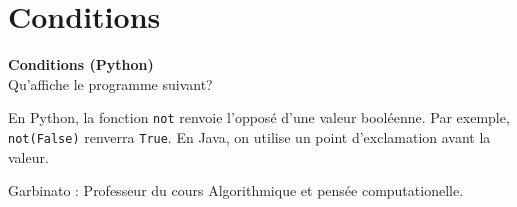 \newpage

\section{Conditions}

\begin{Exercice}[5 minutes] \textbf{Conditions (Python)}\\
    Qu'affiche le programme suivant? \\
    
    

     \begin{conseil}
         En Python, la fonction \lstinline{not} renvoie l'opposé d'une valeur booléenne. Par exemple, \lstinline{not(False)} renverra \lstinline{True}. En Java, on utilise un point d'exclamation avant la valeur.
     \end{conseil}
     \begin{solution}
        Garbinato : Professeur du cours Algorithmique et pensée computationelle.
     \end{solution}   
 \end{Exercice}

